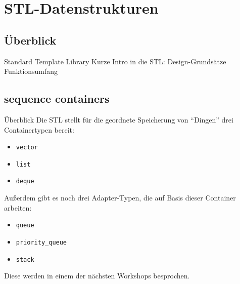 \section{STL-Datenstrukturen}

\subsection{Überblick}

\begin{frame}{Standard Template Library}
	Kurze Intro in die STL:
	Design-Grundsätze
	Funktionsumfang
	
	
\end{frame}


\subsection{sequence containers}

\begin{frame}[fragile]{Überblick}
	Die STL stellt für die geordnete Speicherung von \enquote{Dingen} drei Containertypen bereit:
	\begin{itemize}
		\item \verb|vector|
		\item \verb|list|
		\item \verb|deque|
	\end{itemize}
	
	\pause
	
	Außerdem gibt es noch drei Adapter-Typen, die auf Basis dieser Container arbeiten:
	\begin{itemize}
		\item \verb|queue|
		\item \verb|priority_queue|
		\item \verb|stack|
	\end{itemize}
	
	\pause
	
	Diese werden in einem der nächsten Workshops besprochen.
\end{frame}

